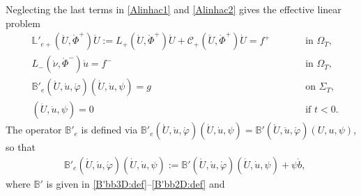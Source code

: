 \documentclass[twoside,11pt]{article}
\numberwithin{equation}{section}
\begin{document}
	Neglecting the last terms in \eqref{Alinhac1} and \eqref{Alinhac2} gives the effective linear problem
	\begin{subequations} \label{ELP1}
		\begin{alignat}{3}
			&\mathbb{L}'_{e+}(\mathring{U}, \mathring{\Phi}^+) \dot{U}
			:=L_+(\mathring{U}, \mathring{\Phi}^+) \dot{U}
			+\mathcal{C}_+( \mathring{U},\mathring{\Phi}^+) \dot{U}=f^+
			&\qquad  &\textrm{in } \Omega_T,
			\label{ELP1a}\\[0.5mm]
			&L_-(\mathring{{\nu}},\mathring{\Phi}^-) \dot{u}=f^-
			&\quad  &\textrm{in } \Omega_T,
			\label{ELP1b}\\[0.5mm]
			\label{ELP1c}   &
			\mathbb{B}'_{e}(\mathring{U}, \mathring{u}, \mathring{\varphi}) (\dot{U},\dot{u},\psi)
			=g
			&&\textrm{on } \Sigma_T,\\[0.5mm]
			&(\dot{U},\dot{u},\psi)=0
			&& \textrm{if } t<0.
			\label{ELP1d}
		\end{alignat}
	\end{subequations}
The operator $\mathbb{B}'_{e}$ %
is defined via $\mathbb{B}'_{e}(\mathring{U}, \mathring{u}, \mathring{\varphi}) (\dot{U},\dot{u},\psi)=\mathbb{B}'(\mathring{U} ,\mathring{u}, \mathring{\varphi})(U,u,\psi)$, so that
	\begin{align}
		\label{B'e:def}
		&\mathbb{B}'_{e}(\mathring{U}, \mathring{u}, \mathring{\varphi}) (\dot{U},\dot{u},\psi)
		:=	\mathbb{B}'(\mathring{U} ,\mathring{u}, \mathring{\varphi})(\dot{U},\dot{u},\psi)
		+\psi \mathring{b},
	\end{align}
	where $\mathbb{B}'$  is given in \eqref{B'bb3D:def}--\eqref{B'bb2D:def} and
\end{document}
